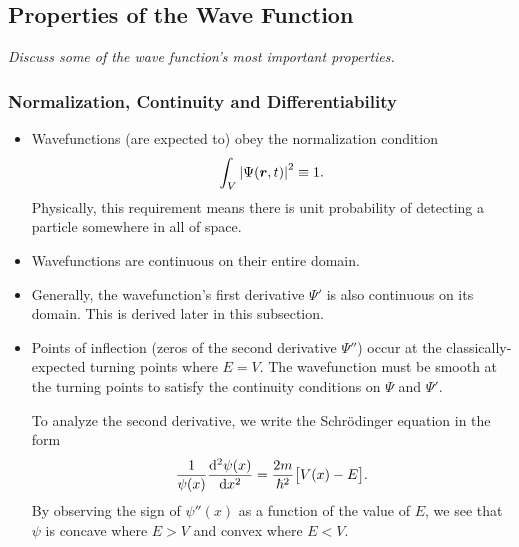 \documentclass[11pt, a4paper]{article}
\newcommand{\Schro}{Schr\"{o}dinger\xspace}
\renewcommand{\vec}[1]{\bm{#1}}  %
\renewcommand{\r}{\vec{r}}  %
\newcommand{\p}{\psi}  %
\renewcommand{\P}{\Psi}  %
\begin{document}
\subsection{Properties of the Wave Function}
\textit{Discuss some of the wave function's most important properties.}

\subsubsection{Normalization, Continuity and Differentiability}
\begin{itemize}
    \item Wavefunctions (are expected to) obey the normalization condition
    \begin{equation*}
        \int_{V} \abs{\Psi(\r, t)}^{2} \equiv 1.
    \end{equation*}
    Physically, this requirement means there is unit probability of detecting a particle somewhere in all of space.
    
    \item Wavefunctions are continuous on their entire domain. 

     \item Generally, the wavefunction's first derivative $ \Psi' $ is also continuous on its domain. This is derived later in this subsection.

	\item Points of inflection (zeros of the second derivative $ \Psi'' $) occur at the classically-expected turning points where $ E = V $. The wavefunction must be smooth at the turning points to satisfy the continuity conditions on $ \P $ and $ \P' $. 

	To analyze the second derivative, we write the \Schro equation in the form
	\begin{equation*}
		\frac{1}{\psi(x)} \dv[2]{\p(x)}{x} = \frac{2m}{\hbar^{2}}\big[V(x) - E\big].
	\end{equation*}
    By observing the sign of $ \psi''(x) $ as a function of the value of $ E $, we see that $ \p $ is concave where $ E > V $ and convex where $ E < V $. 
	
\end{itemize}
\end{document}
